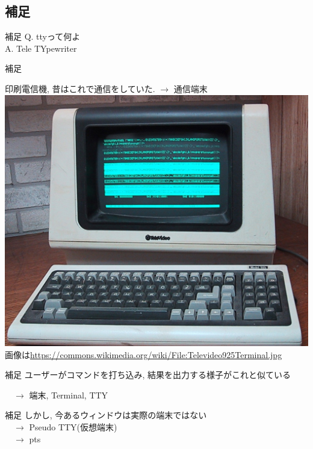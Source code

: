 \documentclass[uplatex, dvipdfmx, unicode]{beamer}
\begin{document}
\subsection{補足}
\begin{frame}{補足}
  Q. ttyって何よ \\
  A. \alert{T}ele \alert{TY}pewriter
\end{frame}

\begin{frame}{補足}
  
  印刷電信機, 昔はこれで通信をしていた. $\rightarrow$ 通信端末
  {
    \centering
    \includegraphics[keepaspectratio, scale=.18]{./img/tty.jpg} \\
  \scriptsize 画像は\url{https://commons.wikimedia.org/wiki/File:Televideo925Terminal.jpg}
  }
\end{frame}

\begin{frame}{補足}
  ユーザーがコマンドを打ち込み, 結果を出力する様子がこれと似ている

  \ \ $\rightarrow$ 端末, Terminal, TTY
\end{frame}

\begin{frame}{補足}
  しかし, 今あるウィンドウは実際の端末ではない\\
  \ \ $\rightarrow$ Pseudo TTY(仮想端末) \\
  \ \ $\rightarrow$ pts
\end{frame}
\end{document}
